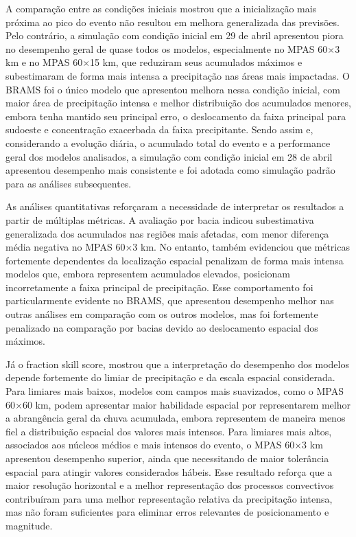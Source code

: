 \documentclass[12pt,a4paper,oneside]{book}
\begin{document}
A comparação entre as condições iniciais mostrou que a inicialização mais próxima ao pico do evento não resultou em melhora generalizada das previsões. Pelo contrário, a simulação com condição inicial em 29 de abril apresentou piora no desempenho geral de quase todos os modelos, especialmente no MPAS 60$\times$3 km e no MPAS 60$\times$15 km, que reduziram seus acumulados máximos e subestimaram de forma mais intensa a precipitação nas áreas mais impactadas. O BRAMS foi o único modelo que apresentou melhora nessa condição inicial, com maior área de precipitação intensa e melhor distribuição dos acumulados menores, embora tenha mantido seu principal erro, o deslocamento da faixa principal para sudoeste e concentração exacerbada da faixa precipitante. Sendo assim e, considerando a evolução diária, o acumulado total do evento e a performance geral dos modelos analisados, a simulação com condição inicial em 28 de abril apresentou desempenho mais consistente e foi adotada como simulação padrão para as análises subsequentes.

As análises quantitativas reforçaram a necessidade de interpretar os resultados a partir de múltiplas métricas. A avaliação por bacia indicou subestimativa generalizada dos acumulados nas regiões mais afetadas, com menor diferença média negativa no MPAS 60$\times$3 km. No entanto, também evidenciou que métricas fortemente dependentes da localização espacial penalizam de forma mais intensa modelos que, embora representem acumulados elevados, posicionam incorretamente a faixa principal de precipitação. Esse comportamento foi particularmente evidente no BRAMS, que apresentou desempenho melhor nas outras análises em comparação com os outros modelos, mas foi fortemente penalizado na comparação por bacias devido ao deslocamento espacial dos máximos.

Já o fraction skill score, mostrou que a interpretação do desempenho dos modelos depende fortemente do limiar de precipitação e da escala espacial considerada. Para limiares mais baixos, modelos com campos mais suavizados, como o MPAS 60$\times$60 km, podem apresentar maior habilidade espacial por representarem melhor a abrangência geral da chuva acumulada, embora representem de maneira menos fiel a distribuição espacial dos valores mais intensos. Para limiares mais altos, associados aos núcleos médios e mais intensos do evento, o MPAS 60$\times$3 km apresentou desempenho superior, ainda que necessitando de maior tolerância espacial para atingir valores considerados hábeis. Esse resultado reforça que a maior resolução horizontal e a melhor representação dos processos convectivos contribuíram para uma melhor representação relativa da precipitação intensa, mas não foram suficientes para eliminar erros relevantes de posicionamento e magnitude.
\end{document}
